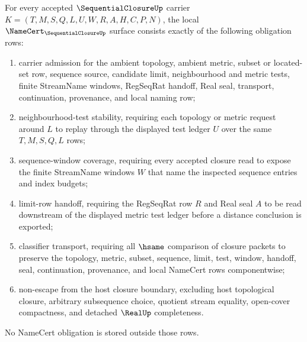 \begin{theorem}
\label{thm:sequential-closure-namecert-obligations}
For every accepted $\SequentialClosureUp$ carrier $K=(T,M,S,Q,L,U,W,R,A,H,C,P,N)$, the local $\NameCert_{\SequentialClosureUp}$ surface consists exactly of the following obligation rows:
\begin{enumerate}
\item carrier admission for the ambient topology, ambient metric, subset or located-set row, sequence source, candidate limit, neighbourhood and metric tests, finite StreamName windows, RegSeqRat handoff, Real seal, transport, continuation, provenance, and local naming row;
\item neighbourhood-test stability, requiring each topology or metric request around $L$ to replay through the displayed test ledger $U$ over the same $T,M,S,Q,L$ rows;
\item sequence-window coverage, requiring every accepted closure read to expose the finite StreamName windows $W$ that name the inspected sequence entries and index budgets;
\item limit-row handoff, requiring the RegSeqRat row $R$ and Real seal $A$ to be read downstream of the displayed metric test ledger before a distance conclusion is exported;
\item classifier transport, requiring all $\hsame$ comparison of closure packets to preserve the topology, metric, subset, sequence, limit, test, window, handoff, seal, continuation, provenance, and local NameCert rows componentwise;
\item non-escape from the host closure boundary, excluding host topological closure, arbitrary subsequence choice, quotient stream equality, open-cover compactness, and detached $\RealUp$ completeness.
\end{enumerate}
No NameCert obligation is stored outside those rows.
\end{theorem}
